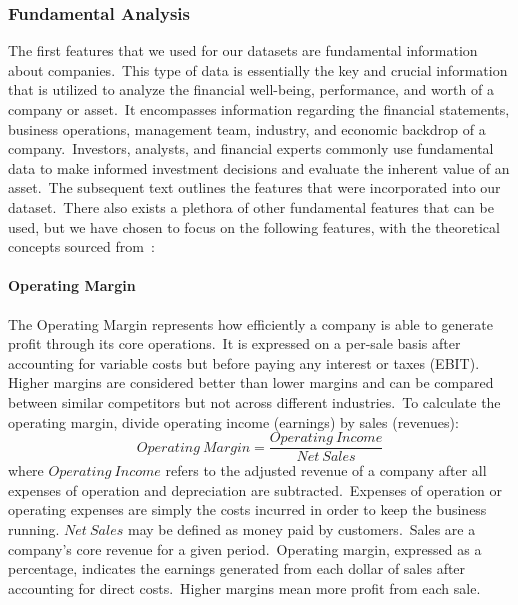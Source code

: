 \documentclass[../xlapes02]{subfiles}
\begin{document}
    \subsubsection{Fundamental Analysis}\label{subsubsec:fundamental-analysis}
    The first features that we used for our datasets are fundamental information about companies.\ This type of data is essentially the key and crucial information that is utilized to analyze the financial well-being, performance, and worth of a company or asset.\ It encompasses information regarding the financial statements, business operations, management team, industry, and economic backdrop of a company.\ Investors, analysts, and financial experts commonly use fundamental data to make informed investment decisions and evaluate the inherent value of an asset.\ The subsequent text outlines the features that were incorporated into our dataset.\ There also exists a plethora of other fundamental features that can be used, but we have chosen to focus on the following features, with the theoretical concepts sourced from~\cite{investopedia}:

    \paragraph{Operating Margin}\label{par:operating-margin}
    The Operating Margin represents how efficiently a company is able to generate profit through its core operations.\ It is expressed on a per-sale basis after accounting for variable costs but before paying any interest or taxes (EBIT). Higher margins are considered better than lower margins and can be compared between similar competitors but not across different industries.\ To calculate the operating margin, divide operating income (earnings) by sales (revenues):
    \begin{equation}
        \label{eq:operating-margin}
        Operating\ Margin=\frac{Operating\ Income}{Net\ Sales}
    \end{equation}
    where $Operating\ Income$ refers to the adjusted revenue of a company after all expenses of operation and depreciation are subtracted.\ Expenses of operation or operating expenses are simply the costs incurred in order to keep the business running. $Net\ Sales$ may be defined as money paid by customers.\ Sales are a company's core revenue for a given period.\ Operating margin, expressed as a percentage, indicates the earnings generated from each dollar of sales after accounting for direct costs.\ Higher margins mean more profit from each sale.
\end{document}
